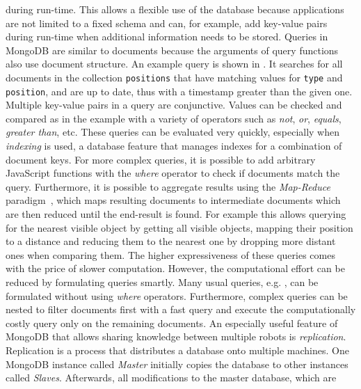 during run-time. This allows a flexible use of the database because
applications are not limited to a fixed schema and can, for example,
add key-value pairs during run-time when additional information needs
to be stored.
Queries in MongoDB are similar to documents because the arguments of
query functions also use document structure. An example query is
shown in . It searches for all documents in
the collection \texttt{positions}
that have matching values for \texttt{type} and \texttt{position}, and
are up to date, thus with a timestamp greater than the given
one. Multiple key-value pairs in a query are conjunctive.  Values can
be checked and compared as in the example with a variety of operators
such as \emph{not}, \emph{or}, \emph{equals}, \emph{greater
  than}, etc. These queries can be evaluated very quickly, especially
when \emph{indexing} is used, a database feature that manages indexes
for a combination of document keys. For more complex queries, it is
possible to add arbitrary JavaScript functions with the \emph{where}
operator to check if documents match the query. Furthermore, it is
possible to aggregate results using the \emph{Map-Reduce}
paradigm~\cite{mapreduce}, which maps resulting documents to
intermediate documents which are then reduced until the end-result is
found. For example this allows querying for the nearest visible object
by getting all visible objects, mapping their position to a distance
and reducing them to the nearest one by dropping more distant ones
when comparing them.  The higher expressiveness of these queries comes
with the price of slower computation. However, the computational
effort can be reduced by formulating queries smartly. Many usual
queries, e.g. , can be formulated without
using \emph{where} operators. Furthermore, complex queries can be
nested to filter documents first with a fast query and execute the
computationally costly query only on the remaining documents.
%
An especially useful feature of MongoDB that allows sharing knowledge
between multiple robots is \emph{replication}. Replication is a
process that distributes a database onto multiple machines.
One MongoDB instance called \emph{Master} initially
copies the database  to other instances called \emph{Slaves}.
Afterwards, all modifications to the master database, which are
